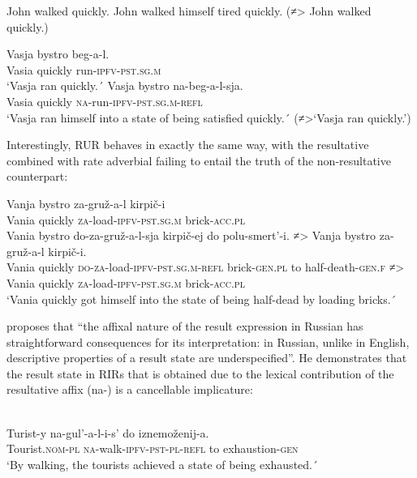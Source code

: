 \documentclass[output=paper,colorlinks,citecolor=brown,modfonts,nonflat]{langsci/langscibook}
\begin{document}
\ea%
    \label{ex:antonyuk:39}
    \ea \label{ex:antonyuk:39a}
    John walked quickly.
    \ex \label{ex:antonyuk:39b}
    John walked himself tired quickly. (≠> John walked quickly.)
    \z
\z

\ea%
    \label{ex:antonyuk:40}
    \ea \label{ex:antonyuk:40a}
    \gll    Vasja bystro beg-a-l.\\
            Vasia quickly run\textsc{-ipfv-pst.sg.m}\\
    \glt    `Vasja ran quickly.´
    \ex \label{ex:antonyuk:40b}
    \gll    Vasja bystro na-beg-a-l-sja.\\
            Vasia quickly \textsc{na-}run\textsc{-ipfv-pst.sg.m-refl}\\
    \glt    `Vasja ran himself into a state of being satisfied quickly.´ (≠>‘Vasja ran quickly.’)
    \z
\z

Interestingly, RUR behaves in exactly the same way, with the resultative combined with rate adverbial failing to entail the truth of the non-resultative counterpart:

\ea%
    \label{ex:antonyuk:41}
    \ea \label{ex:antonyuk:41a}
    \gll    Vanja bystro za-gruž-a-l kirpič-i\\
            Vania quickly \textsc{za-}load\textsc{-ipfv-pst.sg.m} brick\textsc{-acc.pl}\\
    \ex \label{ex:antonyuk:41b}
    \gll    Vania bystro do-za-gruž-a-l-sja kirpič-ej do polu-smert’-i. ≠> 	Vanja bystro za-gruž-a-l kirpič-i.\\
            Vania quickly \textsc{do-za-}load\textsc{-ipfv-pst.sg.m-refl} brick\textsc{-gen.pl} to half-death\textsc{-gen.f} ≠> Vania	quickly \textsc{za-}load\textsc{-ipfv-pst.sg.m}  brick\textsc{-acc.pl}\\
    \glt    `Vania quickly got himself into the state of being half-dead by loading bricks.´
    \z
\z

\citeauthor{Tatevosov2010} proposes that “the affixal nature of the result expression in Russian has straightforward consequences for its interpretation: in Russian, unlike in English, descriptive properties of a result state are underspecified”. He demonstrates that the result state in RIRs that is obtained due to the lexical contribution of the resultative affix ({na}{}-) is a cancellable implicature:

\ea%
    \label{ex:antonyuk:42}
    \citep{Tatevosov2010}\\
    \gll    Turist-y na-gul’-a-l-i-s’ do iznemoženij-a. \\
            Tourist\textsc{.nom-pl} \textsc{na-}walk\textsc{-ipfv-pst-pl-refl} to exhaustion\textsc{-gen}\\
    \glt    `By walking, the tourists achieved a state of being exhausted.´
    \z
\end{document}
